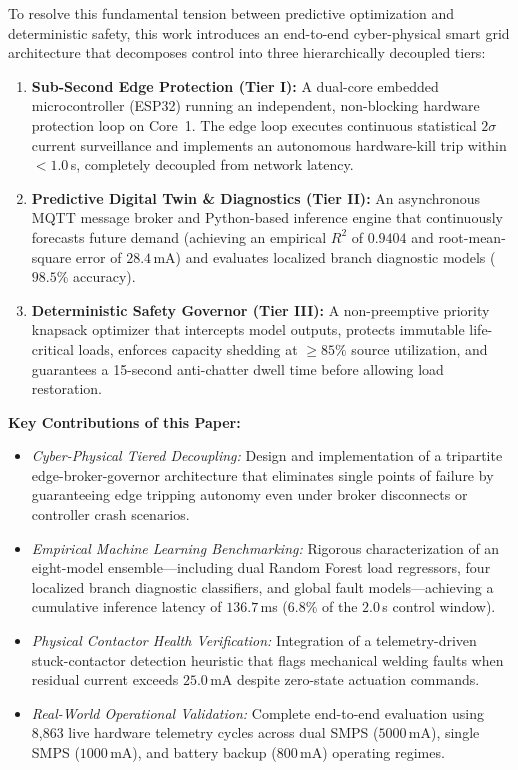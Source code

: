 \documentclass[journal,10pt,twocolumn]{IEEEtran}
\begin{document}
To resolve this fundamental tension between predictive optimization and deterministic safety, this work introduces an end-to-end cyber-physical smart grid architecture that decomposes control into three hierarchically decoupled tiers:
\begin{enumerate}
    \item \textbf{Sub-Second Edge Protection (Tier I):} A dual-core embedded microcontroller (ESP32) running an independent, non-blocking hardware protection loop on Core~1. The edge loop executes continuous statistical $2\sigma$ current surveillance and implements an autonomous hardware-kill trip within $<1.0$\,s, completely decoupled from network latency.
    \item \textbf{Predictive Digital Twin \& Diagnostics (Tier II):} An asynchronous MQTT message broker and Python-based inference engine that continuously forecasts future demand (achieving an empirical $R^2$ of $0.9404$ and root-mean-square error of $28.4$\,mA) and evaluates localized branch diagnostic models ($98.5\%$ accuracy).
    \item \textbf{Deterministic Safety Governor (Tier III):} A non-preemptive priority knapsack optimizer that intercepts model outputs, protects immutable life-critical loads, enforces capacity shedding at $\ge 85\%$ source utilization, and guarantees a 15-second anti-chatter dwell time before allowing load restoration.
\end{enumerate}

\noindent\textbf{Key Contributions of this Paper:}
\begin{itemize}
    \item \textit{Cyber-Physical Tiered Decoupling:} Design and implementation of a tripartite edge-broker-governor architecture that eliminates single points of failure by guaranteeing edge tripping autonomy even under broker disconnects or controller crash scenarios.
    \item \textit{Empirical Machine Learning Benchmarking:} Rigorous characterization of an eight-model ensemble—including dual Random Forest load regressors, four localized branch diagnostic classifiers, and global fault models—achieving a cumulative inference latency of $136.7$\,ms ($6.8\%$ of the $2.0$\,s control window).
    \item \textit{Physical Contactor Health Verification:} Integration of a telemetry-driven stuck-contactor detection heuristic that flags mechanical welding faults when residual current exceeds $25.0$\,mA despite zero-state actuation commands.
    \item \textit{Real-World Operational Validation:} Complete end-to-end evaluation using 8,863 live hardware telemetry cycles across dual SMPS ($5000$\,mA), single SMPS ($1000$\,mA), and battery backup ($800$\,mA) operating regimes.
\end{itemize}
\end{document}
